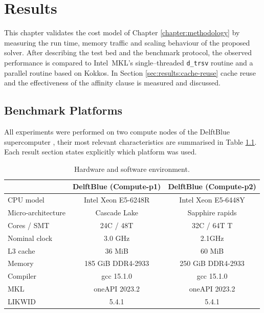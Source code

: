 \chapter{Results}
\label{chapter:Results}

This chapter validates the cost model of
Chapter \ref{chapter:methodology} by measuring the run time, memory
traffic and scaling behaviour of the proposed
solver.  After describing the test bed and the benchmark protocol, the
observed performance is compared to Intel~MKL’s single–threaded
\texttt{d\_trsv} routine and a parallel routine based on Kokkos. In Section \ref{sec:results:cache-reuse} cache reuse and the effectiveness of the affinity clause is measured and discussed.

\section{Benchmark Platforms}
\label{sec:res_platforms}

All experiments were performed on two compute nodes of the DelftBlue supercomputer \cite{delftblue_system},  their most
relevant characteristics are summarised in Table \ref{tab:platforms}.  Each result section states explicitly
which platform was used.

\begin{table}[ht]
  \centering
  \caption{Hardware and software environment.}
  \label{tab:platforms}
  \begin{tabular}{lcc}
    \toprule
                    & DelftBlue (Compute-p1)    & DelftBlue (Compute-p2)  \\
    \midrule
    CPU model       & Intel Xeon E5-6248R  & Intel Xeon E5-6448Y  \\
    Micro‐architecture & Cascade Lake      &  Sapphire rapids   \\
    Cores / SMT     & 24C / 48T &  32C / 64T  T \\
    Nominal clock   & 3.0 GHz                &  2.1GHz    \\
    L3 cache        & 36 MiB                 &  60 MiB   \\
    Memory          & 185 GiB DDR4-2933      &   250 GiB DDR4-2933  \\
    Compiler        & gcc 15.1.0 & gcc 15.1.0 \\
    MKL             & oneAPI 2023.2            &   oneAPI 2023.2  \\
    LIKWID          & 5.4.1                    &  5.4.1   \\
    \bottomrule
  \end{tabular}
\end{table}

